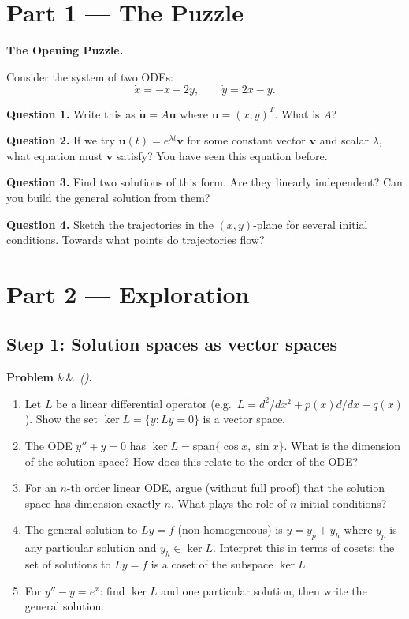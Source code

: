 \documentclass[12pt,a4paper]{article}
\newcounter{problem}
\newenvironment{problem}[1][]{\refstepcounter{problem}\par\vspace{6pt}\noindent\textbf{\color{MidBlue}Problem \theproblem}\ifx&#1&\else\ \textit{(#1)}\fi\textbf{.}\enskip}{\par\vspace{4pt}}
\begin{document}
\newpage

\section{Part 1 \texorpdfstring{---}{--} The Puzzle}

\begin{puzzlebox}
\textbf{The Opening Puzzle.}

Consider the system of two ODEs:
\[
  \dot{x} = -x + 2y, \qquad \dot{y} = 2x - y.
\]

\textbf{Question 1.} Write this as $\dot{\mathbf{u}} = A\mathbf{u}$ where $\mathbf{u}=(x,y)^T$. What is $A$?

\textbf{Question 2.} If we try $\mathbf{u}(t) = e^{\lambda t}\mathbf{v}$ for some constant vector $\mathbf{v}$ and scalar $\lambda$, what equation must $\mathbf{v}$ satisfy? You have seen this equation before.

\textbf{Question 3.} Find two solutions of this form. Are they linearly independent? Can you build the general solution from them?

\textbf{Question 4.} Sketch the trajectories in the $(x,y)$-plane for several initial conditions. Towards what points do trajectories flow?
\end{puzzlebox}

\section{Part 2 \texorpdfstring{---}{--} Exploration}

\subsection{Step 1: Solution spaces as vector spaces}

\begin{problem}
\label{prob:solspace}
\begin{enumerate}[label=(\alph*),topsep=2pt]
  \item Let $L$ be a linear differential operator (e.g.\ $L = d^2/dx^2 + p(x)d/dx + q(x)$). Show the set $\ker L = \{y : Ly = 0\}$ is a vector space.
  \item The ODE $y'' + y = 0$ has $\ker L = \text{span}\{\cos x, \sin x\}$. What is the dimension of the solution space? How does this relate to the order of the ODE?
  \item For an $n$-th order linear ODE, argue (without full proof) that the solution space has dimension exactly $n$. What plays the role of $n$ initial conditions?
  \item The general solution to $Ly = f$ (non-homogeneous) is $y = y_p + y_h$ where $y_p$ is any particular solution and $y_h\in\ker L$. Interpret this in terms of cosets: the set of solutions to $Ly = f$ is a coset of the subspace $\ker L$.
  \item For $y'' - y = e^x$: find $\ker L$ and one particular solution, then write the general solution.
\end{enumerate}
\end{problem}
\end{document}
